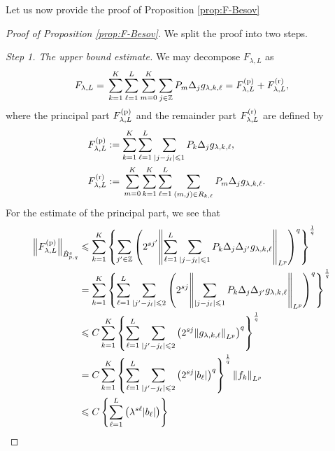 \documentclass[a4paper,12pt,reqno]{amsart}
\theoremstyle{plain}
\theoremstyle{definition}
\newcommand{\dB}{\dot{B}}
\renewcommand{\leq}{\leqslant}
\newcommand{\n}[1]{{\left\|#1\right\|}}
\newcommand{\Z}{\mathbb{Z}}
\newcommand{\Mp}[1]{\left\{#1\right\}}
\renewcommand{\sp}[1]{\left(#1\right)}
\newcommand{\p}{{\rm p}}
\renewcommand{\r}{{\rm r}}
\begin{document}
Let us now provide the proof of Proposition \ref{prop:F-Besov}
\begin{proof}[Proof of Proposition \ref{prop:F-Besov}]
We split the proof into two steps.
%

\noindent
{\it Step 1. The upper bound estimate.}
%
We may decompose $F_{\lambda,L}$ as 
\begin{align}
    F_{\lambda,L}
    ={}
    \sum_{k=1}^K
    \sum_{\ell=1}^L
    \sum_{m=0}^K
    \sum_{j \in \Z}
    P_m\Delta_jg_{\lambda,k,\ell}
    ={}
    F_{\lambda,L}^{(\p)}
    +
    F_{\lambda,L}^{(\r)},
\end{align}
where the principal part $F_{\lambda,L}^{(\p)}$ and the remainder part $F_{\lambda,L}^{(\r)}$ are defined by
\begin{align}
    &
    F_{\lambda,L}^{(\p)}
    :=
    \sum_{k=1}^K
    \sum_{\ell=1}^L
    \sum_{|j-j_{\ell}|\leq 1}
    P_{k}\Delta_jg_{\lambda,k,\ell},
    \\
    &
    \begin{aligned}
    F_{\lambda,L}^{(\r)}
    :={}&
    \sum_{m=0}^K
    \sum_{k=1}^K
    \sum_{\ell=1}^L
    \sum_{(m,j) \in R_{k,\ell}}
    P_m\Delta_jg_{\lambda,k,\ell}.
    \end{aligned}
\end{align}
For the estimate of the principal part, we see that 
\begin{align}
    \n{F_{\lambda,L}^{(\p)}}_{\dB_{p,q}^s}
    &
    \leq 
    \sum_{k=1}^K
    \Mp{
    \sum_{j' \in \Z}
    \sp{
    2^{sj'}
    \n{\sum_{\ell=1}^L
    \sum_{|j-j_{\ell}|\leq 1}
    P_{k}\Delta_j\Delta_{j'}g_{\lambda,k,\ell}
    }_{L^p}
    }^q
    }^{\frac{1}{q}}
    \\
    &
    =
    \sum_{k=1}^K
    \Mp{
    \sum_{\ell=1}^L
    \sum_{|j'-j_{\ell}|\leq 2}
    \sp{
    2^{sj}
    \n{
    \sum_{|j-j_{\ell}|\leq 1}
    P_k\Delta_j\Delta_{j'}g_{\lambda,k,\ell}
    }_{L^p}
    }^q
    }^{\frac{1}{q}}
    \\
    &
    \leq 
    C
    \sum_{k=1}^K
    \Mp{
    \sum_{\ell=1}^L
    \sum_{|j'-j_{\ell}|\leq 2}
    \sp{
    2^{sj}
    \n{
    g_{\lambda,k,\ell}
    }_{L^p}
    }^q
    }^{\frac{1}{q}}
    \\
    &
    =
    C
    \sum_{k=1}^K
    \Mp{
    \sum_{\ell=1}^L
    \sum_{|j'-j_{\ell}|\leq 2}
    \sp{
    2^{sj}
    |b_\ell|
    }^q
    }^{\frac{1}{q}}
    \n{f_k}_{L^p}
    \\
    &
    \leq
    C
    \Mp{
    \sum_{\ell=1}^L
    \sp{
    \lambda^{s\ell}
    |b_\ell|
}}
\end{align}
\end{proof}
\end{document}
